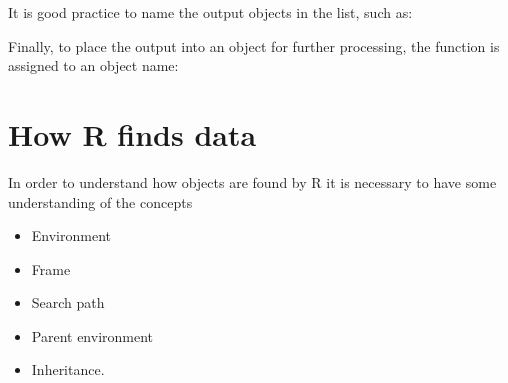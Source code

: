 \documentclass[
]{book}
\newenvironment{Shaded}{\begin{snugshade}}{\end{snugshade}}
\newcommand{\AttributeTok}[1]{\textcolor[rgb]{0.13,0.29,0.53}{#1}}
\newcommand{\CommentTok}[1]{\textcolor[rgb]{0.56,0.35,0.01}{\textit{#1}}}
\newcommand{\ControlFlowTok}[1]{\textcolor[rgb]{0.13,0.29,0.53}{\textbf{#1}}}
\newcommand{\DecValTok}[1]{\textcolor[rgb]{0.00,0.00,0.81}{#1}}
\newcommand{\FunctionTok}[1]{\textcolor[rgb]{0.13,0.29,0.53}{\textbf{#1}}}
\newcommand{\NormalTok}[1]{#1}
\newcommand{\OtherTok}[1]{\textcolor[rgb]{0.56,0.35,0.01}{#1}}
\newcommand{\SpecialCharTok}[1]{\textcolor[rgb]{0.81,0.36,0.00}{\textbf{#1}}}
\providecommand{\tightlist}{%
  \setlength{\itemsep}{0pt}\setlength{\parskip}{0pt}}
\begin{document}
It is good practice to name the output objects in the list, such as:

\begin{Shaded}
\end{Shaded}

Finally, to place the output into an object for further processing, the function is assigned to an object name:

\begin{Shaded}
\end{Shaded}

\section{How R finds data}\label{findData}

In order to understand how objects are found by R it is necessary to have some understanding of the concepts

\begin{itemize}
\tightlist
\item
  Environment
\item
  Frame
\item
  Search path
\item
  Parent environment
\item
  Inheritance.
\end{itemize}
\end{document}
